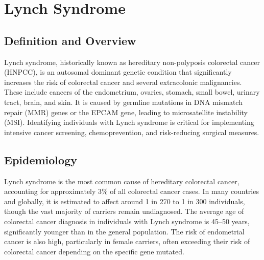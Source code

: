 \chapter{Lynch Syndrome}

\section*{Definition and Overview}
Lynch syndrome, historically known as hereditary non-polyposis colorectal cancer (HNPCC), is an autosomal dominant genetic condition that significantly increases the risk of colorectal cancer and several extracolonic malignancies. These include cancers of the endometrium, ovaries, stomach, small bowel, urinary tract, brain, and skin. It is caused by germline mutations in DNA mismatch repair (MMR) genes or the EPCAM gene, leading to microsatellite instability (MSI). Identifying individuals with Lynch syndrome is critical for implementing intensive cancer screening, chemoprevention, and risk-reducing surgical measures.

\section*{Epidemiology}
Lynch syndrome is the most common cause of hereditary colorectal cancer, accounting for approximately 3\% of all colorectal cancer cases. In many countries and globally, it is estimated to affect around 1 in 270 to 1 in 300 individuals, though the vast majority of carriers remain undiagnosed. The average age of colorectal cancer diagnosis in individuals with Lynch syndrome is 45--50 years, significantly younger than in the general population. The risk of endometrial cancer is also high, particularly in female carriers, often exceeding their risk of colorectal cancer depending on the specific gene mutated.

